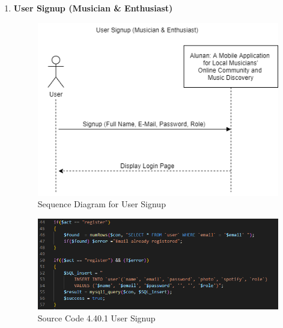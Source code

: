 \begin{enumerate}[1.]
    \item \textbf{User Signup (Musician \& Enthusiast)}
    \begin{figure}[h]
        \centering
        \includegraphics[width=0.8\linewidth]{mainmatter/images/systemint/siusersignup.png}
        \caption{Sequence Diagram for User Signup}
        \label{fig:myfig76}
    \end{figure}
    \begin{figure}[h]\ContinuedFloat
        \centering
        \includegraphics[width=1.0\linewidth]{mainmatter/images/systemint/codesignup.png}
        \caption*{Source Code 4.40.1 User Signup}
        \label{fig:myfig76a}
    \end{figure}
    \clearpage


\end{enumerate}
